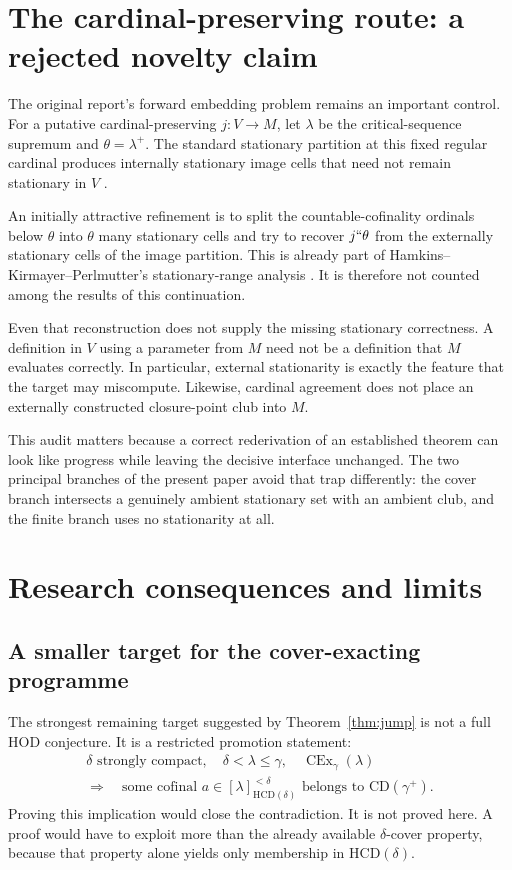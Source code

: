 \documentclass[11pt,letterpaper]{article}
\theoremstyle{definition}
\newcommand{\CEx}{\operatorname{CEx}}
\newcommand{\CD}{\mathrm{CD}}
\newcommand{\HCD}{\mathrm{HCD}}
\newcommand{\powersmall}[3]{[#1]^{<#2}_{#3}}
\begin{document}
\section{The cardinal-preserving route: a rejected novelty claim}\label{sec:cp-audit}

The original report's forward embedding problem remains an important control. For a putative cardinal-preserving $j:V\to M$, let $\lambda$ be the critical-sequence supremum and $\theta=\lambda^+$. The standard stationary partition at this fixed regular cardinal produces internally stationary image cells that need not remain stationary in $V$ \cite{unified,goldbergcp}.

An initially attractive refinement is to split the countable-cofinality ordinals below $\theta$ into $\theta$ many stationary cells and try to recover $j``\theta$ from the externally stationary cells of the image partition. This is already part of Hamkins--Kirmayer--Perlmutter's stationary-range analysis \cite[Theorem 12 and its proof]{hkp}. It is therefore not counted among the results of this continuation.

Even that reconstruction does not supply the missing stationary correctness. A definition in $V$ using a parameter from $M$ need not be a definition that $M$ evaluates correctly. In particular, external stationarity is exactly the feature that the target may miscompute. Likewise, cardinal agreement does not place an externally constructed closure-point club into $M$.

This audit matters because a correct rederivation of an established theorem can look like progress while leaving the decisive interface unchanged. The two principal branches of the present paper avoid that trap differently: the cover branch intersects a genuinely ambient stationary set with an ambient club, and the finite branch uses no stationarity at all.

\section{Research consequences and limits}\label{sec:limits}

\subsection{A smaller target for the cover-exacting programme}

The strongest remaining target suggested by Theorem~\ref{thm:jump} is not a full HOD conjecture. It is a restricted promotion statement:
\[
 \begin{gathered}
 \delta\text{ strongly compact},\quad
 \delta<\lambda\leq\gamma,\quad\CEx_\gamma(\lambda)\\
 \Longrightarrow\quad
 \text{some cofinal }a\in\powersmall{\lambda}{\delta}{\HCD(\delta)}
       \text{ belongs to }\CD(\gamma^+).
 \end{gathered}
\]
Proving this implication would close the contradiction. It is not proved here. A proof would have to exploit more than the already available $\delta$-cover property, because that property alone yields only membership in $\HCD(\delta)$.
\end{document}
